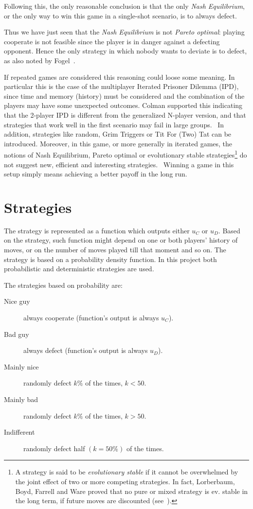 \documentclass[journal,10pt,twoside]{IEEEtran}
\begin{document}
Following this, the only reasonable conclusion is that the only \textit{Nash Equilibrium}, or the only way to win this game in a single-shot scenario, is to always defect.

Thus we have just seen that the \textit{Nash Equilibrium} is not \textit{Pareto optimal}: playing cooperate is not feasible since the player is in danger against a defecting opponent. Hence the only strategy in which nobody wants to deviate is to defect, as also noted by Fogel~\cite{fogelEvolvingBehaviors}.

If repeated games are considered this reasoning could loose some meaning. In particular this is the case of the multiplayer Iterated Prisoner Dilemma (IPD), since time and memory (history) must be considered and the combination of the players may have some unexpected outcomes.
Colman supported this indicating that the 2-player IPD is different from the generalized N-player version, and that strategies that work well in the first scenario may fail in large groups.~\cite{yao1994experimental}
In addition, strategies like random, Grim Triggers or Tit For (Two) Tat can be introduced.
Moreover, in this game, or more generally in iterated games, the notions of Nash Equilibrium, Pareto optimal or evolutionary stable strategies\footnote{A strategy is said to be \textit{evolutionary stable} if it cannot be overwhelmed by the joint effect of two or more competing strategies. In fact, Lorberbaum, Boyd, Farrell and Ware proved that no pure or mixed strategy is ev. stable in the long term, if future moves are discounted (see~\cite{lorb94}).} do not suggest new, efficient and interesting strategies.~\cite{mathieu2017}
Winning a game in this setup simply means achieving a better payoff in the long run.

\section{Strategies} \label{s:str}
The strategy is represented as a function which outputs either $u_C$ or $u_D$. Based on the strategy, such function might depend on one or both players' history of moves, or on the number of moves played till that moment and so on.
The strategy is based on a probability density function. In this project both probabilistic and deterministic strategies are used.

The strategies based on probability are:
\begin{description}
    \item[Nice guy] always cooperate (function's output is always $u_C$).
    \item[Bad guy] always defect (function's output is always $u_D$).
    \item[Mainly nice] randomly defect $k\%$ of the times, $k<50$.%
    \item[Mainly bad] randomly defect $k\%$ of the times, $k>50$.%
    \item[Indifferent] randomly defect half $(k=50\%)$ of the times.
\end{description}
\end{document}
